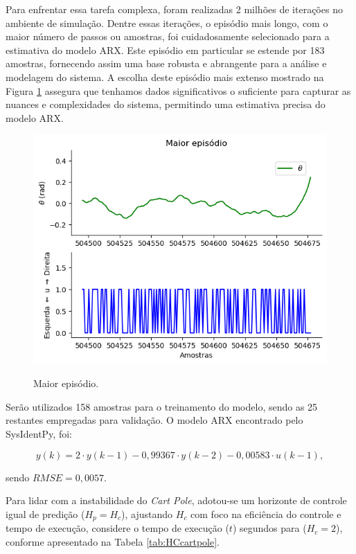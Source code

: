 \documentclass[12pt,           %
a4paper,                       %
openany,                       %
oneside,                       %
chapter=TITLE,                 %
english,                       %
spanish,                       %
brazil,                        %
sumario=tradicional]{abntex2}  %
\begin{document}
\begin{OnehalfSpace}
Para enfrentar essa tarefa complexa, foram realizadas 2 milhões de iterações no ambiente de simulação. Dentre essas iterações, o episódio mais longo, com o maior número de passos ou amostras, foi cuidadosamente selecionado para a estimativa do modelo ARX. Este episódio em particular se estende por 183 amostras, fornecendo assim uma base robusta e abrangente para a análise e modelagem do sistema. A escolha deste episódio mais extenso mostrado na Figura \ref{fig:PRBSz} assegura que tenhamos dados significativos o suficiente para capturar as nuances e complexidades do sistema, permitindo uma estimativa precisa do modelo ARX.

\begin{figure}[H]
     \centering
     \vspace*{-.2cm}
     \caption{Maior episódio.}
     \includegraphics[scale=0.575]{mep.png}
     \label{fig:PRBSz}
\end{figure}
\vspace*{-0.7cm}
{\raggedright {}}

Serão utilizados 158 amostras para o treinamento do modelo, sendo as 25 restantes empregadas para validação. O modelo ARX encontrado pelo SysIdentPy, foi:

\begin{equation}
    y(k) = 2\cdot y(k-1)- 0,99367\cdot y(k-2)  - 0,00583\cdot u(k-1),
    \label{eq:28}
\end{equation}

\noindent sendo $RMSE = 0,0057$.

Para lidar com a instabilidade do \textit{Cart Pole}, adotou-se um horizonte de controle igual de predição ($H_p=H_c$), ajustando $H_c$ com foco na eficiência do controle e tempo de execução, considere o tempo de execução ($t$) segundos para ($H_c=2$), conforme apresentado na Tabela \ref{tab:HCcartpole}.
 

\end{OnehalfSpace}
\end{document}
